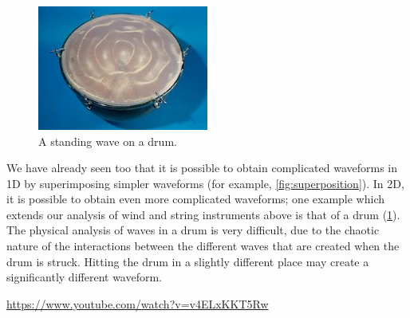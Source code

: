 \documentclass[a4paper]{amsbook}
\makeatletter
\newcommand{\goandwatch}[1]{
\begin{center}
\begin{tcolorbox}[width=0.8\textwidth,colback={SkyBlue!20},title={\textbf{Go and watch...}},colbacktitle=MidnightBlue,coltitle=White]
  \textcolor{MidnightBlue}{\url{#1}}
\end{tcolorbox}
\end{center}}
\newcommand{\partintro}[1]{\gdef\@partintro{#1}}
\newcommand{\partcover}[1]{\gdef\@partcover{#1}}
\theoremstyle{definition}
\numberwithin{exercise}{chapter}
\numberwithin{exercise}{chapter}
\newcommand\swatchcolor[1]{}
\makeatother
\begin{document}
\begin{figure}
  \centering
  \includegraphics[width=0.5\textwidth]{2dstandingwave}
  \caption{A standing wave on a drum.}\label{fig:2dstandingwave}
\end{figure}
We have already seen too that it is possible to obtain complicated waveforms in 1D by superimposing simpler waveforms (for
example, \cref{fig:superposition}). In 2D, it is possible to obtain even more complicated waveforms; one example which extends
our analysis of wind and string instruments above is that of a drum (\cref{fig:2dstandingwave}). The physical analysis of waves
in a drum is very difficult, due to the chaotic nature of the interactions between the different waves that are created when the drum
is struck. Hitting the drum in a slightly different place may create a significantly different waveform.

\goandwatch{https://www.youtube.com/watch?v=v4ELxKKT5Rw}



\swatchcolor{WildStrawberry}
\partcover{electriccover}
\partintro{
  We continue our study of electromagnetism by looking at the relationships between capacitance, induction,
  and oscillating currents. Circuit analysis (useful for engineering) is also discussed in a little more detail
  than last year. There are some striking links to mechanical systems that we also highlight.

  I think it is important to note that, in my opinion, this is the most difficult of the Level Three topics (and
  may be one of the most difficult of any Level Three paper in any subject). You should have a good grasp of the
  following topics in physics and mathematics:
  \begin{itemize}
    \item Everything in L2 related to electric and magnetic fields
    \item Simple harmonic motion
    \item Definite and indefinite integrals
    \item Differential equations
  \end{itemize}
}
\end{document}
